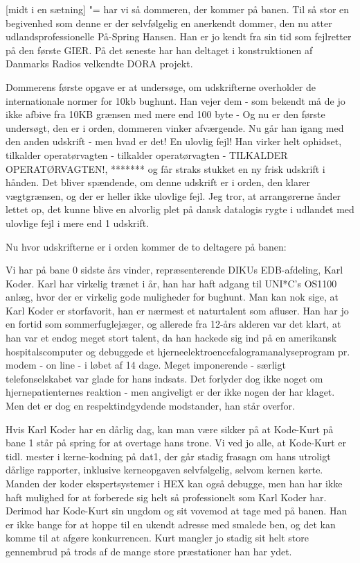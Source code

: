 \documentclass[a4paper,11pt]{article}
\begin{document}
\begin{sketch}

  [midt i en sætning] "= har vi så dommeren, der kommer på
  banen.  Til så stor en begivenhed som denne er der selvfølgelig en
  anerkendt dommer, den nu atter udlandsprofessionelle På-Spring
  Hansen.  Han er jo kendt fra sin tid som fejlretter på den første
  GIER.  På det seneste har han deltaget i konstruktionen af Danmarks
  Radios velkendte DORA projekt.

  Dommerens første opgave er at undersøge, om udskrifterne overholder
  de internationale normer for 10kb bughunt.  Han vejer dem  - som bekendt må de jo ikke afbive fra 10KB grænsen med
  mere end 100 byte - Og nu er den første undersøgt, den er i orden,
  dommeren vinker afværgende.  Nu går han igang med den anden udskrift
  - men hvad er det!  En ulovlig fejl!  Han virker helt ophidset,
  tilkalder operatørvagten - tilkalder operatørvagten - TILKALDER
  OPERATØRVAGTEN!, ******* og får straks stukket en ny frisk udskrift
  i hånden.  Det bliver spændende, om denne udskrift er i orden, den
  klarer vægtgrænsen, og der er heller ikke ulovlige fejl.  Jeg tror,
  at arrangørerne ånder lettet op, det kunne blive en alvorlig plet på
  dansk datalogis rygte i udlandet med ulovlige fejl i mere end 1
  udskrift.

  Nu hvor udskrifterne er i orden kommer de to deltagere på banen:


   Vi har på bane 0 sidste års vinder, repræsenterende DIKUs
  EDB-afdeling, Karl Koder.  Karl har virkelig trænet i år, han har
  haft adgang til UNI*C's OS1100 anlæg, hvor der er virkelig gode
  muligheder for bughunt.  Man kan nok sige, at Karl Koder er
  storfavorit, han er nærmest et naturtalent som afluser.  Han har jo
  en fortid som sommerfuglejæger, og allerede fra 12-års alderen var
  det klart, at han var et endog meget stort talent, da han hackede
  sig ind på en amerikansk hospitalscomputer og debuggede et
  hjerneelektroencefalogramanalyseprogram pr. modem - on line - i
  løbet af 14 dage.  Meget imponerende - særligt telefonselskabet var
  glade for hans indsats.  Det forlyder dog ikke noget om
  hjernepatienternes reaktion - men angiveligt er der ikke nogen der
  har klaget.  Men det er dog en respektindgydende modstander, han
  står overfor.

  Hvis Karl Koder har en dårlig dag, kan man være sikker på at
  Kode-Kurt på bane 1 står på spring for at overtage hans trone.  Vi
  ved jo alle, at Kode-Kurt er tidl. mester i kerne-kodning på dat1,
  der går stadig frasagn om hans utroligt dårlige rapporter, inklusive
  kerneopgaven selvfølgelig, selvom kernen kørte.  Manden der koder
  ekspertsystemer i HEX kan også debugge, men han har ikke haft
  mulighed for at forberede sig helt så professionelt som Karl Koder
  har.  Derimod har Kode-Kurt sin ungdom og sit vovemod at tage med på
  banen.  Han er ikke bange for at hoppe til en ukendt adresse med
  smalede ben, og det kan komme til at afgøre konkurrencen.  Kurt
  mangler jo stadig sit helt store gennembrud på trods af de mange
  store præstationer han har ydet.


\end{sketch}
\end{document}
